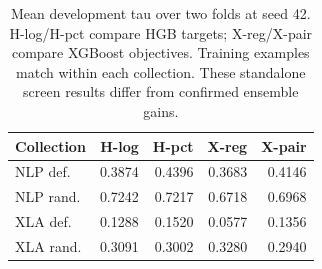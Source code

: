 \begin{table}[t]
\centering
\begin{tabular}{@{}lrrrr@{}}
\toprule
Collection & H-log & H-pct & X-reg & X-pair \\
\midrule
NLP def. & 0.3874 & 0.4396 & 0.3683 & 0.4146 \\
NLP rand. & 0.7242 & 0.7217 & 0.6718 & 0.6968 \\
XLA def. & 0.1288 & 0.1520 & 0.0577 & 0.1356 \\
XLA rand. & 0.3091 & 0.3002 & 0.3280 & 0.2940 \\
\bottomrule
\end{tabular}
\caption{Mean development tau over two folds at seed 42. H-log/H-pct compare HGB targets; X-reg/X-pair compare XGBoost objectives. Training examples match within each collection. These standalone screen results differ from confirmed ensemble gains.}
\label{tab:targets}
\end{table}
